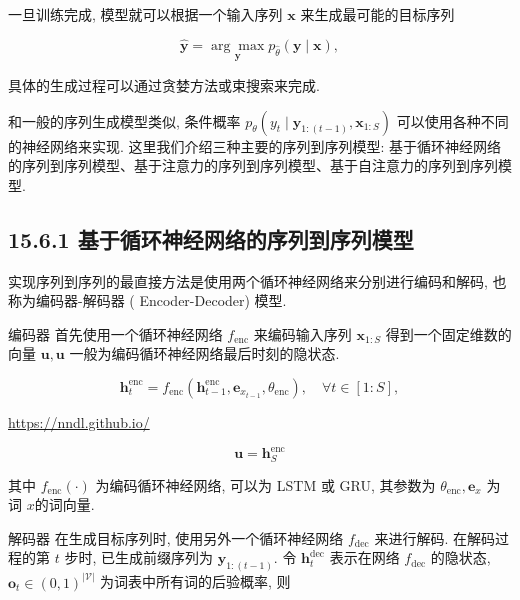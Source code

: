\documentclass[10pt]{article}
\begin{document}
一旦训练完成, 模型就可以根据一个输入序列 $\boldsymbol{x}$ 来生成最可能的目标序列


\begin{equation*}
\hat{\boldsymbol{y}}=\underset{\boldsymbol{y}}{\arg \max } p_{\hat{\theta}}(\boldsymbol{y} \mid \boldsymbol{x}), \tag{15.98}
\end{equation*}


具体的生成过程可以通过贪婪方法或束搜索来完成.

和一般的序列生成模型类似, 条件概率 $p_{\theta}\left(y_{t} \mid \boldsymbol{y}_{1:(t-1)}, \boldsymbol{x}_{1: S}\right)$ 可以使用各种不同的神经网络来实现. 这里我们介绍三种主要的序列到序列模型: 基于循环神经网络的序列到序列模型、基于注意力的序列到序列模型、基于自注意力的序列到序列模型.

\subsection*{15.6.1 基于循环神经网络的序列到序列模型}
实现序列到序列的最直接方法是使用两个循环神经网络来分别进行编码和解码, 也称为编码器-解码器 ( Encoder-Decoder) 模型.

编码器 首先使用一个循环神经网络 $f_{\mathrm{enc}}$ 来编码输入序列 $\boldsymbol{x}_{1: S}$ 得到一个固定维数的向量 $\boldsymbol{u}, \boldsymbol{u}$ 一般为编码循环神经网络最后时刻的隐状态.


\begin{equation*}
\boldsymbol{h}_{t}^{\mathrm{enc}}=f_{\mathrm{enc}}\left(\boldsymbol{h}_{t-1}^{\mathrm{enc}}, \boldsymbol{e}_{x_{t-1}}, \theta_{\mathrm{enc}}\right), \quad \forall t \in[1: S], \tag{15.99}
\end{equation*}


\href{https://nndl.github.io/}{https://nndl.github.io/}


\begin{equation*}
\boldsymbol{u}=\boldsymbol{h}_{S}^{\mathrm{enc}} \tag{15.100}
\end{equation*}


其中 $f_{\mathrm{enc}}(\cdot)$ 为编码循环神经网络, 可以为 LSTM 或 GRU, 其参数为 $\theta_{\mathrm{enc}}, \boldsymbol{e}_{x}$ 为词 $x$的词向量.

解码器 在生成目标序列时, 使用另外一个循环神经网络 $f_{\mathrm{dec}}$ 来进行解码. 在解码过程的第 $t$ 步时, 已生成前缀序列为 $\boldsymbol{y}_{1:(t-1)}$. 令 $\boldsymbol{h}_{t}^{\mathrm{dec}}$ 表示在网络 $f_{\mathrm{dec}}$ 的隐状态, $\boldsymbol{o}_{t} \in(0,1)^{|\mathcal{V}|}$ 为词表中所有词的后验概率, 则
\end{document}
